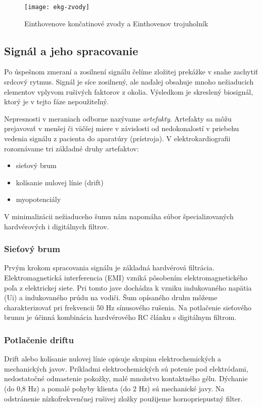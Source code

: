 \documentclass[titlepage]{article}
\begin{document}
\begin{figure}[!ht]
\begin{center}
\texttt{[image: ekg-zvody]}
\caption{Einthovenove končatinové zvody a Einthovenov trojuholník}
\end{center}
\end{figure}


\subsection{Signál a jeho spracovanie}
Po úspešnom zmeraní a zosilnení signálu čelíme zložitej prekážke v snahe zachytiť srdcový rytmus. Signál je síce zosilnený, ale naďalej obsahuje mnoho nežiaducich elementov vplyvom rušivých faktorov z okolia. Výsledkom je skreslený biosignál, ktorý je v tejto fáze nepoužiteľný.

Nepresnosti v meraniach odborne nazývame \emph{artefakty}. Artefakty sa môžu prejavovať v menšej či väčšej miere v závislosti od nedokonalostí v priebehu vedenia signálu z pacienta do aparatúry (prístroja). V elektrokardiografii rozoznávame tri základné druhy artefaktov:
\begin{itemize}
	\item sieťový brum
	\item kolísanie nulovej línie (drift)
	\item myopotenciály
\end{itemize}

V minimalizácii nežiaduceho šumu nám napomáha súbor špecializovaných hardvérových i digitálnych filtrov.

\subsubsection{Sieťový brum}
Prvým krokom spracovania signálu je základná hardvérová filtrácia. Elektromagnetická interferencia (EMI) vzniká pôsobením  elektromagnetického poľa z elektrickej siete. Pri tomto jave dochádza k vzniku indukovaného napätia (Ui) a indukovaného prúdu na vodiči. Šum opísaného druhu môžeme charakterizovať pri frekvencii 50 Hz sínusového rušenia. Na potlačenie sieťového brumu je účinná kombinácia hardvérového RC článku s digitálnym filtrom. 

\subsubsection{Potlačenie driftu}
Drift alebo kolísanie nulovej línie opisuje skupinu elektrochemických a mechanických javov. Príkladmi elektrochemických sú potenie pod elektródami, nedostatočné odmastenie pokožky, malé množstvo kontaktného gélu. Dýchanie (do 0,8 Hz) a pomalé pohyby klienta (do 2 Hz) sú mechanické javy. Na odstránenie nízkofrekvenčnej rušivej zložky použijeme hornopriepustný filter.
\end{document}
